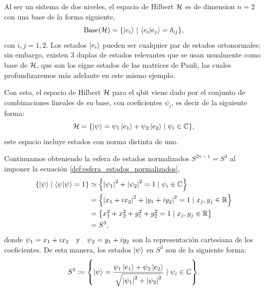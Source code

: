 \documentclass[../Main.tex]{subfiles}
\begin{document}
Al ser un sistema de dos niveles, el espacio de Hilbert $\mathcal{H}$ es de dimension $n=2$ con una base de la forma siguiente, 
\begin{equation}
    \text{Base}(\H)=\qty{\ket{e_i}\,|\,\ip{e_i}{\e_j}=\delta_{ij}},
\end{equation}
con $i,j=1,2$. Los estados $\ket{e_i}$ pueden ser cualquier par de estados ortonormales; sin embargo, existen 3 duplas de estados relevantes que se usan usualmente como base de $\mathcal{H}$, que son los eigne estados de las matrices de Pauli, las cuales profundizaremos más adelante en este mismo ejemplo.

Con esto, el espacio de Hilbert $\mathcal{H}$ para el qbit viene dado por el conjunto de combinaciones lineales de su base, con coeficientes $\psi_i$, es decir de la siguiente forma:
\begin{equation}
    \mathcal{H} = \qty{\ket{\psi}= \psi_1 \ket{e_1}+\psi_2 \ket{e_2}\mid\psi_i\in\mathbb{C}},
    \label{def:hilbert_space_qbit}
\end{equation}
este espacio incluye estados con norma distinta de uno. 


Continuamos obteniendo la esfera de estados normalizados $S^{2n-1}=S^3$ al imponer la ecuación \eqref{def:esfera_estados_normalizados}, 
\begin{align}
    \qty{\ket{\psi}\mid\ip{\psi}=1}
    &\simeq\qty{\abs{\psi_1}^2+\abs{\psi_2}^2=1\mid\psi_i\in\C}\notag\\
    &=\qty{\abs{x_1+ix_2}^2+\abs{y_1+iy_2}^2=1\mid x_j,y_j\in\R}\notag\\
    &=\qty{x_1^2+x_2^2+y_1^2+y_2^2=1\mid x_j,y_j\in\R}\notag\\
    &=S^{3},
\end{align}
donde $\psi_1=x_1+ix_2\qq{y}\psi_2=y_1+iy_2$ son la representación cartesiana de los coeficientes. De esta manera, los estados $\ket{\psi}$ en $S^{3}$ son de la siguiente forma:
\begin{equation}
   S^{3} \coloneqq \qty{\ket{\psi}=\frac{\psi_1\ket{e_1}+\psi_2\ket{e_2}}{\sqrt{\abs{\psi_1}^2+\abs{\psi_2}^2}}\mid \psi_i\in\mathbb{C}}.
    \label{def:esfera_estados_normalizados_qbit}
\end{equation}
\end{document}
